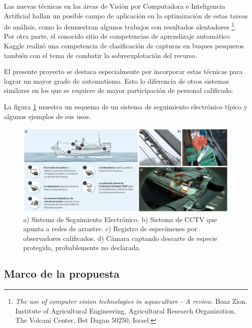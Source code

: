 \documentclass[11pt]{charter}
\begin{document}
Las nuevas técnicas en las áreas de Visión por Computadora e Inteligencia Artificial hallan un posible campo de aplicación en la optimización de estas tareas de análisis, como lo demuestran algunos trabajos con resultados alentadores \footnote{{\em The use of computer vision technologies in aquaculture - A review}. Boaz Zion. Institute of Agricultural Engineering, Agricultural Research Organization, The Volcani Center, Bet Dagan 50250, Israel.
}. Por otra parte, el conocido sitio de competencias de aprendizaje automático Kaggle realizó una competencia de clasificación de capturas en buques pesqueros también con el tema de  combatir la sobreexplotación del recurso.

El presente proyecto se destaca especialmente por incorporar estas técnicas para lograr un mayor grado de automatismo. Esto lo diferencia de otros sistemas similares en los que se requiere de mayor participación de personal calificado.

La figura \ref{fig:seguimiento_electronico} muestra un esquema de un sistema de seguimiento electrónico típico y algunos ejemplos de sus usos.

\vspace{25px}

\begin{figure}[htpb]
\centering 
\includegraphics[width=1.\textwidth]{./Figuras/seguimiento_electronico.png}
\caption{ a) Sistema de Seguimiento Electrónico. b) Sistema de CCTV que apunta a redes de arrastre. c) Registro de especímenes por observadores calificados. d) Cámara captando descarte de especie protegida, probablemente no declarada.}
\label{fig:seguimiento_electronico}
\end{figure}

\vspace{25px}

\subsection{Marco de la propuesta}
\end{document}
